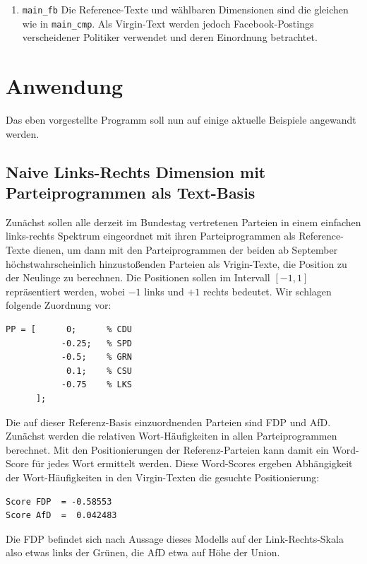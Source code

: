 \begin{enumerate}[(a)]
\begin{enumerate}
\item \verb|main_fb| \newline
Die Reference-Texte und wählbaren Dimensionen sind die gleichen wie in \verb|main_cmp|. Als Virgin-Text werden jedoch Facebook-Postings verscheidener Politiker verwendet und deren Einordnung betrachtet. 

\end{enumerate}

   
\end{enumerate}


\section{Anwendung}
Das eben vorgestellte Programm soll nun auf einige aktuelle Beispiele angewandt werden.
    \subsection{Naive Links-Rechts Dimension mit Parteiprogrammen als Text-Basis}
    Zunächst sollen alle derzeit im Bundestag vertretenen Parteien in einem einfachen links-rechts Spektrum eingeordnet mit ihren Parteiprogrammen als Reference-Texte dienen, um dann mit den Parteiprogrammen der beiden ab September höchstwahrscheinlich hinzustoßenden Parteien als Vrigin-Texte, die Position zu der Neulinge zu berechnen. Die Positionen sollen im Intervall $[-1,1]$ repräsentiert werden, wobei $-1$ links und $+1$ rechts bedeutet. Wir schlagen folgende Zuordnung vor:
    \begin{lstlisting}[style=Matlab-editor]
PP = [      0;      % CDU
           -0.25;   % SPD
           -0.5;    % GRN
            0.1;    % CSU
           -0.75    % LKS
      ];    
    \end{lstlisting}
      
     Die auf dieser Referenz-Basis einzuordnenden Parteien sind FDP und AfD. 
     Zunächst werden die relativen Wort-Häufigkeiten in allen Parteiprogrammen berechnet. 
     Mit den Positionierungen der Referenz-Parteien kann damit ein Word-Score für jedes Wort ermittelt werden.
     Diese Word-Scores ergeben Abhängigkeit der Wort-Häufigkeiten in den Virgin-Texten die gesuchte Positionierung:
    \begin{lstlisting}[style=Matlab-editor]
Score FDP  = -0.58553 
Score AfD  =  0.042483
    \end{lstlisting}
    Die FDP befindet sich nach Aussage dieses Modells auf der Link-Rechts-Skala also etwas links der Grünen, die AfD etwa auf Höhe der Union.
    
